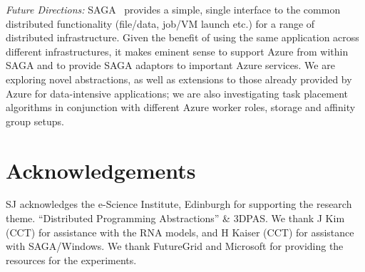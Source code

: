 \documentclass[conference,final]{IEEEtran}
\newcommand{\up}{\vspace*{-1em}}
\def\acknowledgementname{Acknowledgements}
\newenvironment{acknowledgement}%
{\section*{\acknowledgementname}%
\parindent=0pt%
}
\newcommand{\alnote}[1]{ {\textcolor{blue} { ***AL: #1 }}}
\newcommand{\jhanote}[1]{ {\textcolor{red} { ***SJ: #1 }}}
\newcommand{\alnote}[1]{}
\newcommand{\jhanote}[1]{}
\begin{document}
{\it Future Directions:} SAGA~\cite{saga_url} provides a simple,
single interface to the common distributed functionality (file/data,
job/VM launch etc.) for a range of distributed infrastructure.  Given
the benefit of using the same application across different
infrastructures, it makes eminent sense to support Azure from within
SAGA and to provide SAGA adaptors to important Azure services. %
We are exploring novel abstractions, as well as extensions to those
already provided by Azure for data-intensive applications; we are also
investigating task placement algorithms in conjunction with different
Azure worker roles, storage and affinity group setups.
  
  

  


\up
\begin{acknowledgement} 
  \up \footnotesize{%
    SJ acknowledges the e-Science Institute, Edinburgh for supporting
    the research theme. ``Distributed Programming Abstractions'' \&
    3DPAS.  We thank J Kim (CCT) for assistance with the RNA models,
    and H Kaiser (CCT) for assistance with SAGA/Windows. We thank
    FutureGrid and Microsoft for providing the resources for the
    experiments.}
\end{acknowledgement}

\up

%

\end{document}
